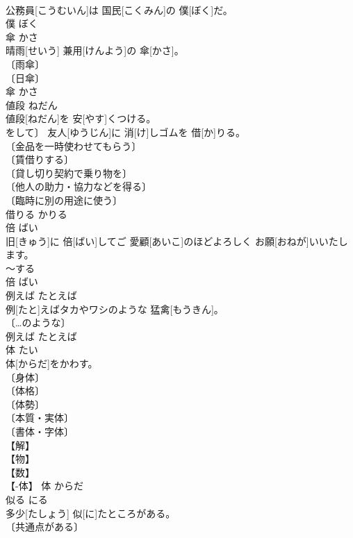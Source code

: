 \documentclass[8pt]{extreport}
\begin{document}
\begin{CJK}{UTF8}{min}
\\	公務員[こうむいん]は 国民[こくみん]の 僕[ぼく]だ。	
\\	[⇒げなん, げじょ]	僕	ぼく	
\\	傘	かさ	
\\	晴雨[せいう] 兼用[けんよう]の 傘[かさ]。	
\\	〔雨傘〕 
\\	〔日傘〕 
\\	傘	かさ	
\\	値段	ねだん	
\\	値段[ねだん]を 安[やす]くつける。	
\\	[⇒ね３, かかく２, そうば 
\\	値段	ねだん	
\\	借りる	かりる	
\\	忘れ物[わすれもの]をして〕 友人[ゆうじん]に 消[け]しゴムを 借[か]りる。	
\\	〔金品を一時使わせてもらう〕 
\\	〔賃借りする〕 
\\	〔貸し切り契約で乗り物を〕 
\\	〔他人の助力・協力などを得る〕 
\\	〔臨時に別の用途に使う〕 
\\	借りる	かりる	
\\	倍	ばい	
\\	旧[きゅう]に 倍[ばい]してご 愛顧[あいこ]のほどよろしく お願[おねが]いいたします。	
\\	～する 
\\	倍	ばい	
\\	例えば	たとえば	
\\	例[たと]えばタカやワシのような 猛禽[もうきん]。	
\\	〔…のような〕 
\\	例えば	たとえば	
\\	体	たい	
\\	体[からだ]をかわす。	
\\	〔身体〕 
\\	〔体格〕 
\\	〔体勢〕 
\\	〔本質・実体〕 
\\	〔書体・字体〕 
\\	【解】 
\\	【物】 
\\	【数】 
\\	【-体】	体	からだ	
\\	似る	にる	
\\	多少[たしょう] 似[に]たところがある。	
\\	〔共通点がある〕 

\end{CJK}
\end{document}
